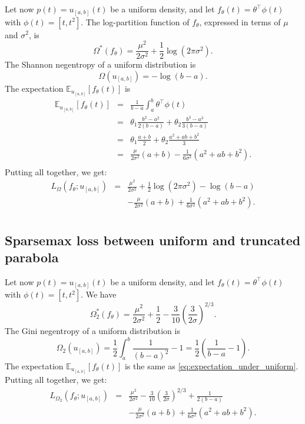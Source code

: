 \documentclass{article}
\begin{document}
{Let now $p(t) = u_{[a,b]}(t)$ be a uniform density, and let $f_\theta(t) = \theta^\top \phi(t)$ with $\phi(t) = [t, t^2]$.
The log-partition function of $f_\theta$, expressed in terms of $\mu$ and $\sigma^2$, is
\begin{equation}
\Omega^*(f_\theta) = \frac{\mu^2}{2\sigma^2} + \frac{1}{2}\log(2\pi\sigma^2).
\end{equation}
The Shannon negentropy of a uniform distribution is
\begin{equation}
\Omega(u_{[a,b]}) = -\log(b-a).
\end{equation}
The expectation $\mathbb{E}_{u_{[a,b]}}[f_\theta(t)]$ is
\begin{eqnarray}\label{eq:expectation_under_uniform}
\mathbb{E}_{u_{[a,b]}}[f_\theta(t)] &=& \frac{1}{b-a}\int_a^b \theta^\top \phi(t)\nonumber\\
&=& \theta_1 \frac{b^2 - a^2}{2(b-a)} + \theta_2 \frac{b^3 - a^3}{3(b-a)}\nonumber\\
&=& \theta_1 \frac{a+b}{2} + \theta_2 \frac{a^2 + ab + b^2}{3}\nonumber\\
&=& \frac{\mu}{2\sigma^2} (a+b) - \frac{1}{6\sigma^2} (a^2 + ab + b^2).\nonumber\\
\end{eqnarray}
Putting all together, we get:
\begin{eqnarray}
    L_\Omega(f_\theta; u_{[a,b]}) &=&
    \frac{\mu^2}{2\sigma^2} + \frac{1}{2}\log(2\pi\sigma^2) -\log(b-a)\nonumber\\ && -\frac{\mu}{2\sigma^2} (a+b) + \frac{1}{6\sigma^2} (a^2 + ab + b^2).\nonumber\\
\end{eqnarray}


\subsection{Sparsemax loss between uniform and truncated parabola}

Let now $p(t) = u_{[a,b]}(t)$ be a uniform density, and let $f_\theta(t) = \theta^\top \phi(t)$ with $\phi(t) = [t, t^2]$.
We have
\begin{equation}
\Omega_2^*(f_\theta) = \frac{\mu^2}{2\sigma^2} +
\frac{1}{2} -\frac{3}{10} \left(\frac{3}{2\sigma} \right)^{2/3}.
\end{equation}
The Gini negentropy of a uniform distribution is
\begin{equation}
\Omega_2(u_{[a,b]}) = \frac{1}{2} \int_a^b \frac{1}{(b-a)^2} - 1 = \frac{1}{2}\left(\frac{1}{b-a} - 1\right).
\end{equation}
The expectation $\mathbb{E}_{u_{[a,b]}}[f_\theta(t)]$ is the same as \eqref{eq:expectation_under_uniform}.
Putting all together, we get:
\begin{eqnarray}
    L_{\Omega_2}(f_\theta; u_{[a,b]}) &=&
    \frac{\mu^2}{2\sigma^2}
    -\frac{3}{10} \left(\frac{3}{2\sigma} \right)^{2/3} +
    \frac{1}{2(b-a)}\nonumber\\ && -\frac{\mu}{2\sigma^2} (a+b) + \frac{1}{6\sigma^2} (a^2 + ab + b^2).\nonumber\\
\end{eqnarray}
}
\end{document}
